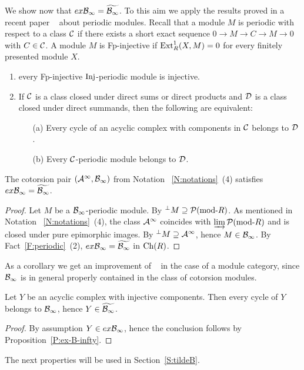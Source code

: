   We show now that $ex\mathcal{B}_{\infty}=\widetilde{\mathcal{B}_{\infty}}$. To this aim we apply the results proved in a recent paper ~\cite{BCIE} about periodic modules.
   Recall that a module $M$ is periodic with respect to a class $\mathcal{C}$ if there exists a short exact sequence $0\to M\to C\to M\to 0$ with $C\in \mathcal{C}$. A module $M$ is Fp-injective if $\operatorname{Ext}^1_R(X, M)=0$ for every finitely presented module $X$.

\begin{fact}\label{F:periodic}
 \begin{enumerate}
\item \cite[Proposition 3.8~(1)]{BCIE} every Fp-injective $\mathrm{Inj}$-periodic module is injective.
 \item \cite{EFI} If $\mathcal{C}$ is  a class closed under direct sums or direct products and  $\mathcal{D}$ is a class closed under direct summands, then the following are equivalent:
\begin{enumerate}
\item[(a)] Every cycle of an acyclic complex with components in $\mathcal{C}$ belongs to $\mathcal{D}$.
\item[(b)]  Every $\mathcal{C}$-periodic module belongs to $\mathcal{D}$.
\end{enumerate}

\end{enumerate}
\end{fact}

%
%
%
%
%
%
%
%
%
%
%
%

 \begin{prop}\label{P:ex-B-infty} The cotorsion pair $(\mathcal{A}^{\infty}, \mathcal{B}_{\infty})$ from Notation~
 \ref{N:notations}~(4) satisfies $ex\mathcal{B}_{\infty}=\widetilde{\mathcal{B}_{\infty}}$.
%
%
%
%
%
%
\end{prop}
%
\begin{proof}  Let $M$ be a $\mathcal{B}_{\infty}$-periodic module. By \cite[Lemma 3.4]{BCIE} ${}^\perp M\supseteq \mathcal{P}(\mathrm{mod}\textrm{-}R)$. As mentioned in Notation~
 \ref{N:notations}~(4), the class  $\mathcal{A}^{\infty}$ coincides with $\varinjlim \mathcal{P}(\mathrm{mod}\textrm{-}R)$ and is closed under pure epimorphic images. By \cite[Theorem 3.7]{BCIE} ${}^\perp M\supseteq \mathcal{A}^{\infty}$, hence $M\in\mathcal{B}_{\infty}$. By Fact~\ref{F:periodic}~(2), $ex\mathcal{B}_{\infty}=\widetilde{\mathcal{B}_{\infty}}$ in $\mathrm{Ch}(R)$.
  \end{proof}
%

As a corollary we get  an improvement of ~\cite[Corollary 5.9]{Stopurity} in the case of a module category, since $ \mathcal{B}_{\infty}$ is in general properly contained in the class of cotorsion modules.
\begin{cor}\label{C:exInj}
Let $Y$ be an acyclic complex with injective components. Then every cycle of $Y$ belongs to $ \mathcal{B}_{\infty}$, hence $Y\in \widetilde{ \mathcal{B}_{\infty}}$.
\end{cor}
%
\begin{proof} By assumption $Y\in ex\mathcal{B}_{\infty}$, hence the conclusion follows by Proposition~\ref{P:ex-B-infty}.
%
%
 \end{proof}
%
%
%
%
 The next properties will be used in Section~\ref{S:tildeB}.

